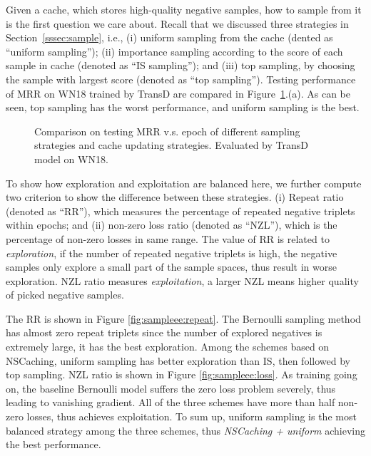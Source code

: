 \documentclass[conference]{IEEEtran}
\begin{document}
Given a cache, which stores high-quality negative samples, 
how to sample from it is the first question we care about. 
Recall that we discussed three strategies in Section~\ref{sssec:sample}, i.e., 
(i) uniform sampling from the cache (dented as ``uniform sampling''); 
(ii) importance sampling according to the score of each sample in cache (denoted as ``IS sampling''); and
(iii) top sampling, by choosing the sample with largest score (denoted as ``top sampling'').
Testing performance of MRR on WN18 trained by TransD are compared in Figure~\ref{fig:ablation:sample}.(a).
As can be seen,
top sampling has the worst performance,
and uniform sampling is the best.


\begin{figure}[ht]
\caption{Comparison on testing MRR v.s. epoch of different sampling strategies and cache updating strategies. Evaluated by TransD model on WN18.}
\label{fig:ablation:sample}
\end{figure}

To show how exploration and exploitation are balanced here,
we further compute two criterion to show the difference between these strategies. 
(i) Repeat ratio (denoted as ``RR''), 
which measures the percentage of repeated negative triplets  within  epochs; and 
(ii) non-zero loss ratio (denoted as ``NZL''), which is the percentage of non-zero losses in same range. 
The value of RR is related to \emph{exploration}, if the number of repeated negative triplets is high, 
the negative samples only explore a small part of the sample spaces, thus result in worse exploration. 
NZL ratio measures \emph{exploitation}, a larger NZL means higher quality of picked negative samples.

The RR is shown in Figure \ref{fig:sampleee:repeat}. 
The Bernoulli sampling method has almost zero repeat triplets since the number of explored negatives is extremely large, 
it has the best exploration. 
Among the schemes based on NSCaching, uniform sampling has better exploration than IS, 
then followed by top sampling. NZL ratio is shown in Figure \ref{fig:sampleee:loss}. 
{
As training going on, the baseline Bernoulli model suffers the zero loss problem severely, thus leading to vanishing gradient.
}
All of the three schemes have more than half non-zero losses, thus achieves exploitation.
To sum up,
uniform sampling is the most balanced strategy among 
the three schemes,
thus \textit{NSCaching + uniform} achieving the best performance.
\end{document}
